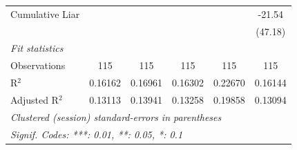 \begin{tabular}{lccccc}
   Cumulative Liar  &               &               &               &               & -21.54\\   
                    &               &               &               &               & (47.18)\\   
   \midrule
   \emph{Fit statistics}\\
   Observations     & 115           & 115           & 115           & 115           & 115\\  
   R$^2$            & 0.16162       & 0.16961       & 0.16302       & 0.22670       & 0.16144\\  
   Adjusted R$^2$   & 0.13113       & 0.13941       & 0.13258       & 0.19858       & 0.13094\\  
   \midrule \midrule
   \multicolumn{6}{l}{\emph{Clustered (session) standard-errors in parentheses}}\\
   \multicolumn{6}{l}{\emph{Signif. Codes: ***: 0.01, **: 0.05, *: 0.1}}\\
\end{tabular}
\par\endgroup


